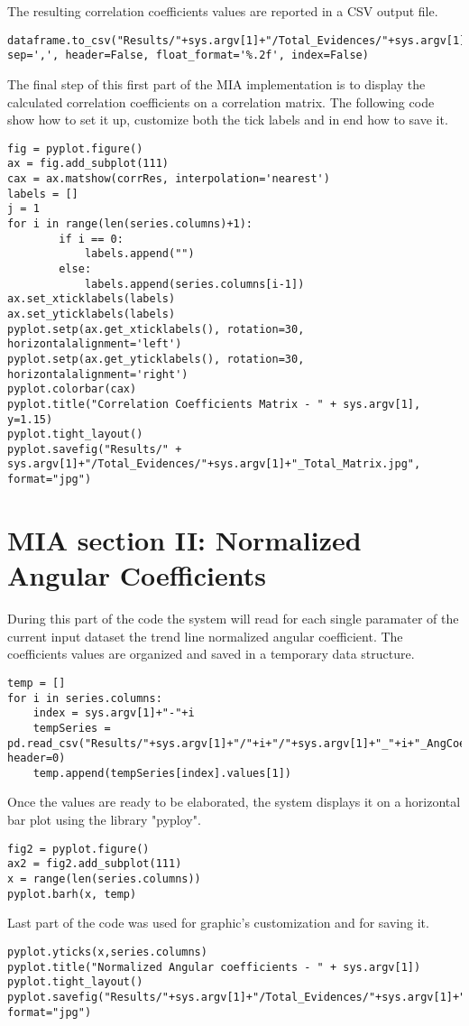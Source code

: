The resulting correlation coefficients values are reported in a CSV output file.
\begin{lstlisting}
dataframe.to_csv("Results/"+sys.argv[1]+"/Total_Evidences/"+sys.argv[1]+"_CorrCoeff.csv", sep=',', header=False, float_format='%.2f', index=False)
\end{lstlisting} 

The final step of this first part of the MIA implementation is to display the calculated correlation coefficients on a correlation matrix. The following code show how to set it up, customize both the tick labels and in end how to save it.
\begin{lstlisting}
fig = pyplot.figure()
ax = fig.add_subplot(111)
cax = ax.matshow(corrRes, interpolation='nearest')
labels = []
j = 1
for i in range(len(series.columns)+1):
		if i == 0:
			labels.append("")
		else:
			labels.append(series.columns[i-1])
ax.set_xticklabels(labels)
ax.set_yticklabels(labels)
pyplot.setp(ax.get_xticklabels(), rotation=30, horizontalalignment='left')
pyplot.setp(ax.get_yticklabels(), rotation=30, horizontalalignment='right')
pyplot.colorbar(cax)
pyplot.title("Correlation Coefficients Matrix - " + sys.argv[1], y=1.15)
pyplot.tight_layout()
pyplot.savefig("Results/" + sys.argv[1]+"/Total_Evidences/"+sys.argv[1]+"_Total_Matrix.jpg", format="jpg")

\end{lstlisting}
\section{MIA section II: Normalized Angular Coefficients}
\label{MIA_section_II}

During this part of the code the system will read for each single paramater of the current input dataset the trend line normalized angular coefficient. The coefficients values are organized and saved in a temporary data structure.
\begin{lstlisting}
temp = [] 
for i in series.columns:
	index = sys.argv[1]+"-"+i
	tempSeries = pd.read_csv("Results/"+sys.argv[1]+"/"+i+"/"+sys.argv[1]+"_"+i+"_AngCoeff.csv", header=0)
	temp.append(tempSeries[index].values[1])
\end{lstlisting}

Once the values are ready to be elaborated, the system displays it on a horizontal bar plot using the library "pyploy".
\begin{lstlisting}
fig2 = pyplot.figure()
ax2 = fig2.add_subplot(111)
x = range(len(series.columns))
pyplot.barh(x, temp)
\end{lstlisting}

Last part of the code was used for graphic's customization and for saving it.
\begin{lstlisting}
pyplot.yticks(x,series.columns)
pyplot.title("Normalized Angular coefficients - " + sys.argv[1])
pyplot.tight_layout()
pyplot.savefig("Results/"+sys.argv[1]+"/Total_Evidences/"+sys.argv[1]+"_Norm_Ang_Coeffs.jpg", format="jpg")
\end{lstlisting}
